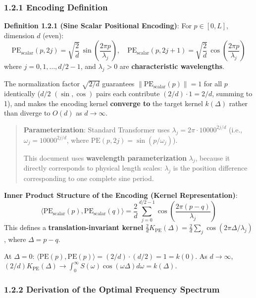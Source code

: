 \documentclass[
  12pt,
]{article}
\begin{document}
\subsubsection{1.2.1 Encoding Definition}\label{encoding-definition}

\textbf{Definition 1.2.1 (Sine Scalar Positional Encoding)}: For $p \in [0, L]$, dimension $d$ (even):
\[\boxed{\text{PE}_{\text{scalar}}(p, 2j) = \sqrt{\frac{2}{d}}\,\sin\left(\frac{2\pi p}{\lambda_j}\right), \quad \text{PE}_{\text{scalar}}(p, 2j+1) = \sqrt{\frac{2}{d}}\,\cos\left(\frac{2\pi p}{\lambda_j}\right)}\]
where $j = 0, 1, \ldots, d/2 - 1$, and $\lambda_j > 0$ are \textbf{characteristic wavelengths}.

The normalization factor $\sqrt{2/d}$ guarantees $\|\text{PE}_{\text{scalar}}(p)\| = 1$ for all $p$ identically ($d/2$ $(\sin,\cos)$ pairs each contribute $(2/d) \cdot 1 = 2/d$, summing to 1), and makes the encoding kernel \textbf{converge to} the target kernel $k(\Delta)$ rather than diverge to $O(d)$ as $d \to \infty$.

\begin{quote}
\textbf{Parameterization}: Standard Transformer uses $\lambda_j = 2\pi \cdot 10000^{2j/d}$ (i.e., $\omega_j = 10000^{2j/d}$, where $\text{PE}(p, 2j) = \sin(p/\omega_j)$).

This document uses \textbf{wavelength parameterization} $\lambda_j$, because it directly corresponds to physical length scales: $\lambda_j$ is the position difference corresponding to one complete sine period.
\end{quote}

\textbf{Inner Product Structure of the Encoding (Kernel Representation)}:
\[\langle \text{PE}_{\text{scalar}}(p), \text{PE}_{\text{scalar}}(q) \rangle = \frac{2}{d}\sum_{j=0}^{d/2-1} \cos\left(\frac{2\pi(p-q)}{\lambda_j}\right)\]
This defines a \textbf{translation-invariant kernel} $\frac{2}{d}K_{\text{PE}}(\Delta) = \frac{2}{d}\sum_j \cos(2\pi\Delta/\lambda_j)$, where $\Delta = p - q$.

At $\Delta = 0$: $\langle \text{PE}(p), \text{PE}(p) \rangle = (2/d) \cdot (d/2) = 1 = k(0)$. As $d \to \infty$, $(2/d)K_{\text{PE}}(\Delta) \to \int_0^\infty S(\omega)\cos(\omega\Delta)d\omega = k(\Delta)$.

\subsubsection{1.2.2 Derivation of the Optimal Frequency Spectrum}\label{optimal-frequency-spectrum-derivation}
\end{document}
